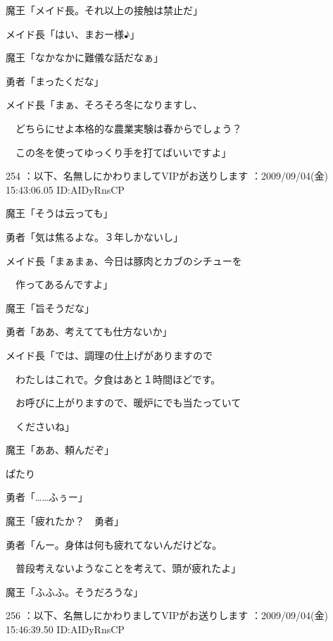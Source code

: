 \documentclass[a4j,twocolumn]{tarticle}
\begin{document}
魔王「メイド長。それ以上の接触は禁止だ」\par{} 
メイド長「はい、まおー様♪」 



魔王「なかなかに難儀な話だなぁ」\par{} 
勇者「まったくだな」 



メイド長「まぁ、そろそろ冬になりますし、\par{} 
　どちらにせよ本格的な農業実験は春からでしょう？\par{} 
　この冬を使ってゆっくり手を打てばいいですよ」 

	
    
    

254 ：以下、名無しにかわりましてVIPがお送りします ：2009/09/04(金) 15:43:06.05 ID:AIDyRnsCP 


魔王「そうは云っても」\par{} 
勇者「気は焦るよな。３年しかないし」 



メイド長「まぁまぁ、今日は豚肉とカブのシチューを\par{} 
　作ってあるんですよ」 



魔王「旨そうだな」\par{} 
勇者「ああ、考えてても仕方ないか」\par{} 
メイド長「では、調理の仕上げがありますので\par{} 
　わたしはこれで。夕食はあと１時間ほどです。\par{} 
　お呼びに上がりますので、暖炉にでも当たっていて\par{} 
　くださいね」 



魔王「ああ、頼んだぞ」 



ぱたり 



勇者「……ふぅー」\par{} 
魔王「疲れたか？　勇者」 \par{}
勇者「んー。身体は何も疲れてないんだけどな。\par{} 
　普段考えないようなことを考えて、頭が疲れたよ」 



魔王「ふふふ。そうだろうな」 

	
    
    

256 ：以下、名無しにかわりましてVIPがお送りします ：2009/09/04(金) 15:46:39.50 ID:AIDyRnsCP 
\end{document}
